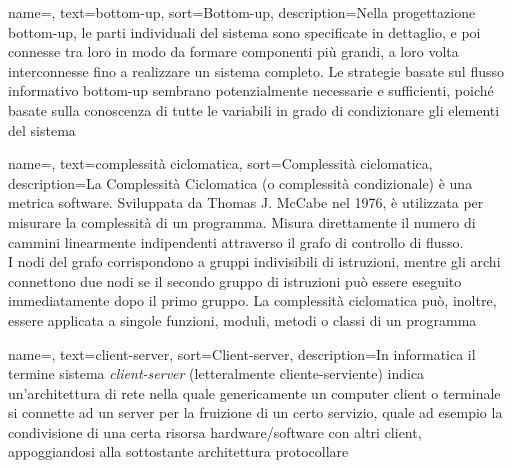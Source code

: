 {
    name=,
    text=bottom-up,
    sort=Bottom-up,
    description={Nella progettazione bottom-up, le parti individuali del sistema sono specificate in dettaglio, e poi connesse tra loro in modo da formare componenti più grandi, a loro volta interconnesse fino a realizzare un sistema completo. Le strategie basate sul flusso informativo bottom-up sembrano potenzialmente necessarie e sufficienti, poiché basate sulla conoscenza di tutte le variabili in grado di condizionare gli elementi del sistema}
}

{
    name=,
    text=complessità ciclomatica,
    sort=Complessità ciclomatica,
    description={La Complessità Ciclomatica (o complessità condizionale) è una metrica software. Sviluppata da Thomas J. McCabe nel 1976, è utilizzata per misurare la complessità di un programma. Misura direttamente il numero di cammini linearmente indipendenti attraverso il grafo di controllo di flusso.\\
    I nodi del grafo corrispondono a gruppi indivisibili di istruzioni, mentre gli archi connettono due nodi se il secondo gruppo di istruzioni può essere eseguito immediatamente dopo il primo gruppo. La complessità ciclomatica può, inoltre, essere applicata a singole funzioni, moduli, metodi o classi di un programma}
}

{
    name=,
    text=client-server,
    sort=Client-server,
    description={In informatica il termine sistema \emph{client-server} (letteralmente cliente-serviente) indica un'architettura di rete nella quale genericamente un computer client o terminale si connette ad un server per la fruizione di un certo servizio, quale ad esempio la condivisione di una certa risorsa hardware/software con altri client, appoggiandosi alla sottostante architettura protocollare}
}
